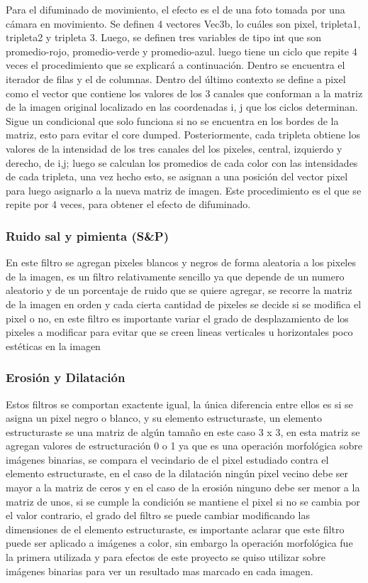 \documentclass[11pt]{article}
\begin{document}
Para el difuminado de movimiento, el efecto es el de una foto tomada por una cámara en movimiento. Se definen 4 vectores Vec3b, lo cuáles son pixel, tripleta1, tripleta2 y tripleta 3. Luego, se definen tres variables de tipo int que son promedio-rojo, promedio-verde y promedio-azul. luego tiene un ciclo que repite 4 veces el procedimiento que se explicará a continuación. Dentro se encuentra el iterador de filas y el de columnas. Dentro del último contexto se define a pixel como el vector que contiene los valores de los 3 canales que conforman a la matriz de la imagen original localizado en las coordenadas i, j que los ciclos determinan. Sigue un condicional que solo funciona si no se encuentra en los bordes de la matriz, esto para evitar el core dumped. Posteriormente, cada tripleta obtiene los valores de la intensidad de los tres canales del los pixeles, central, izquierdo y derecho, de i,j; luego se calculan los promedios de cada color con las intensidades de cada tripleta, una vez hecho esto, se asignan a una posición del vector pixel para luego asignarlo a la nueva matriz de imagen. Este procedimiento es el que se repite por 4 veces, para obtener el efecto de difuminado.\\

\subsubsection{Ruido sal y pimienta (S\&P)}
En este filtro se agregan pixeles blancos y negros de forma aleatoria a los pixeles de la imagen, es un filtro relativamente sencillo ya que depende de un numero aleatorio y de un porcentaje de ruido que se quiere agregar, se recorre la matriz de la imagen en orden y cada cierta cantidad de pixeles se decide si se modifica el pixel o no, en este filtro es importante variar el grado de desplazamiento de los pixeles a modificar para evitar que se creen lineas verticales u horizontales poco estéticas en la imagen
	
\subsubsection{Erosión y Dilatación}
Estos filtros se comportan exactente igual, la única diferencia entre ellos es si se asigna un pixel negro o blanco, y su elemento estructuraste, un elemento estructuraste se una matriz de algún tamaño en este caso 3 x 3, en esta matriz se agregan valores de estructuración 0 o 1 ya que es una operación morfológica sobre imágenes binarias, se compara el vecindario de el pixel estudiado contra el elemento estructuraste, en el caso de la dilatación ningún pixel vecino debe ser mayor a la matriz de ceros y en el caso de la erosión ninguno debe ser menor a la matriz de unos, si se cumple la condición se mantiene el pixel si no se cambia por el valor contrario, el grado del filtro se puede cambiar modificando las dimensiones de el elemento estructuraste, es importante aclarar que este filtro puede ser aplicado a imágenes a color, sin embargo la operación morfológica fue la primera utilizada y para efectos de este proyecto se quiso utilizar sobre imágenes binarias para ver un resultado mas marcado en cada imagen.
	
\end{document}
